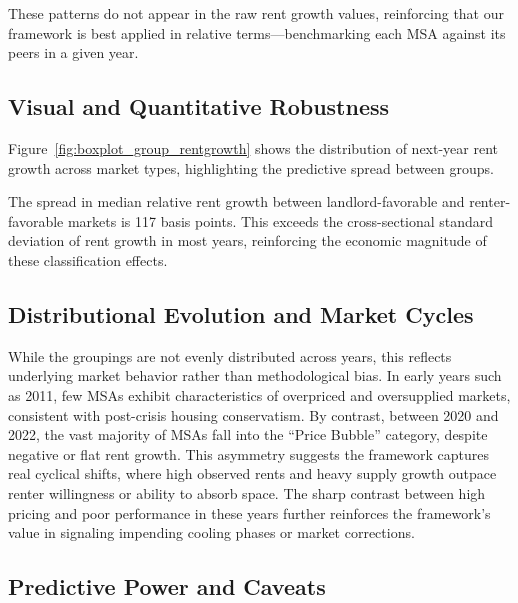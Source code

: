 \documentclass[sn-mathphys-num]{sn-jnl}%
\begin{document}
These patterns do not appear in the raw rent growth values, reinforcing that our framework is best applied in relative terms—benchmarking each MSA against its peers in a given year.

\subsection*{Visual and Quantitative Robustness}

Figure~\ref{fig:boxplot_group_rentgrowth} shows the distribution of next-year rent growth across market types, highlighting the predictive spread between groups.



The spread in median relative rent growth between landlord-favorable and renter-favorable markets is 117 basis points. This exceeds the cross-sectional standard deviation of rent growth in most years, reinforcing the economic magnitude of these classification effects.

\subsection*{Distributional Evolution and Market Cycles}

While the groupings are not evenly distributed across years, this reflects underlying market behavior rather than methodological bias. In early years such as 2011, few MSAs exhibit characteristics of overpriced and oversupplied markets, consistent with post-crisis housing conservatism. By contrast, between 2020 and 2022, the vast majority of MSAs fall into the “Price Bubble” category, despite negative or flat rent growth. This asymmetry suggests the framework captures real cyclical shifts, where high observed rents and heavy supply growth outpace renter willingness or ability to absorb space. The sharp contrast between high pricing and poor performance in these years further reinforces the framework’s value in signaling impending cooling phases or market corrections.

\subsection*{Predictive Power and Caveats}
\end{document}
